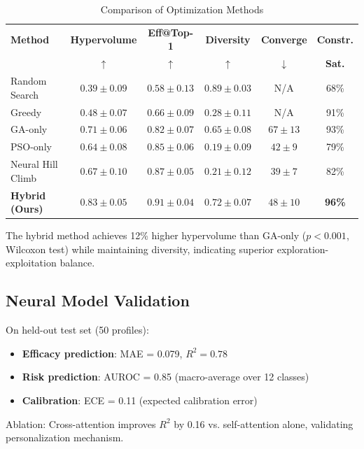 \documentclass[11pt,a4paper]{article}
\begin{document}
\begin{table}[h]
\centering
\caption{Comparison of Optimization Methods}
\label{tab:comparison}
\begin{tabular}{lccccc}
\toprule
\textbf{Method} & \textbf{Hypervolume} & \textbf{Eff@Top-1} & \textbf{Diversity} & \textbf{Converge} & \textbf{Constr.} \\
& $\uparrow$ & $\uparrow$ & $\uparrow$ & $\downarrow$ & \textbf{Sat.} \\
\midrule
Random Search & $0.39 \pm 0.09$ & $0.58 \pm 0.13$ & $0.89 \pm 0.03$ & N/A & 68\% \\
Greedy & $0.48 \pm 0.07$ & $0.66 \pm 0.09$ & $0.28 \pm 0.11$ & N/A & 91\% \\
GA-only & $0.71 \pm 0.06$ & $0.82 \pm 0.07$ & $0.65 \pm 0.08$ & $67 \pm 13$ & 93\% \\
PSO-only & $0.64 \pm 0.08$ & $0.85 \pm 0.06$ & $0.19 \pm 0.09$ & $42 \pm 9$ & 79\% \\
Neural Hill Climb & $0.67 \pm 0.10$ & $0.87 \pm 0.05$ & $0.21 \pm 0.12$ & $39 \pm 7$ & 82\% \\
\midrule
\textbf{Hybrid (Ours)} & \textbf{$0.83 \pm 0.05$} & \textbf{$0.91 \pm 0.04$} & \textbf{$0.72 \pm 0.07$} & \textbf{$48 \pm 10$} & \textbf{96\%} \\
\bottomrule
\end{tabular}
\end{table}

The hybrid method achieves 12\% higher hypervolume than GA-only ($p < 0.001$, Wilcoxon test) while maintaining diversity, indicating superior exploration-exploitation balance.

\subsection{Neural Model Validation}

On held-out test set (50 profiles):
\begin{itemize}
    \item \textbf{Efficacy prediction}: MAE = 0.079, $R^2 = 0.78$
    \item \textbf{Risk prediction}: AUROC = 0.85 (macro-average over 12 classes)
    \item \textbf{Calibration}: ECE = 0.11 (expected calibration error)
\end{itemize}

Ablation: Cross-attention improves $R^2$ by 0.16 vs. self-attention alone, validating personalization mechanism.
\end{document}
